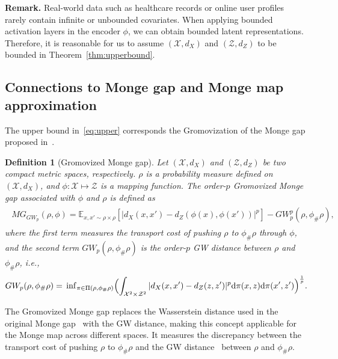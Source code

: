 \documentclass{article}
\newtheorem{definition}{Definition}
\begin{document}
\textbf{Remark.} 
Real-world data such as healthcare records or online user profiles rarely contain infinite or unbounded covariates. 
When applying bounded activation layers in the encoder $\phi$, we can obtain bounded latent representations.
Therefore, it is reasonable for us to assume $(\mathcal{X},d_{X})$ and $(\mathcal{Z},d_Z)$ to be bounded in Theorem~\ref{thm:upperbound}.

\subsection{Connections to Monge gap and Monge map approximation}
The upper bound in~\eqref{eq:upper} corresponds the Gromovization of the Monge gap proposed in~\cite{uscidda2023monge}.
\begin{definition}[Gromovized Monge gap]\label{def-gromov-monge-gap}
    Let $(\mathcal{X},d_{X})$ and $(\mathcal{Z},d_{Z})$ be two compact metric spaces, respectively.
    $\rho$ is a probability measure defined on $(\mathcal{X},d_{X})$, and $\phi:\mathcal{X}\mapsto\mathcal{Z}$ is a mapping function. 
    The order-$p$ Gromovized Monge gap associated with $\phi$ and $\rho$ is defined as 
    \begin{eqnarray}\label{eq:gmg}
    \begin{aligned}
        MG_{GW_p}(\rho,\phi)=\mathbb{E}_{x,x'\sim\rho\times\rho}[|d_X(x,x')-d_Z(\phi(x),\phi(x'))|^p] - GW_p^p(\rho,\phi_{\#}\rho),
    \end{aligned}
    \end{eqnarray}
    where the first term measures the transport cost of pushing $\rho$ to $\phi_{\#}\rho$ through $\phi$, and the second term $GW_p(\rho,\phi_{\#}\rho)$ is the order-$p$ GW distance between $\rho$ and $\phi_{\#}\rho$, i.e.,
    \begin{eqnarray*}\label{eq:gwd}
    \begin{aligned}
    GW_p(\rho,\phi_{\#}\rho)=\sideset{}{_{\pi\in\Pi(\rho,\phi_{\#}\rho)}}\inf\Bigl(\int_{\mathcal{X}^2\times\mathcal{Z}^2}|d_X(x,x')-d_Z(z,z')|^p\mathrm{d}\pi(x,z)\mathrm{d}\pi(x',z')\Bigr)^{\frac{1}{p}}.
    \end{aligned}
    \end{eqnarray*}
\end{definition}
The Gromovized Monge gap replaces the Wasserstein distance used in the original Monge gap~\cite{uscidda2023monge} with the GW distance, making this concept applicable for the Monge map across different spaces. 
It measures the discrepancy between the transport cost of pushing $\rho$ to $\phi_{\#}\rho$ and the GW distance~\cite{memoli2011gromov} between $\rho$ and $\phi_{\#}\rho$. 
\end{document}

